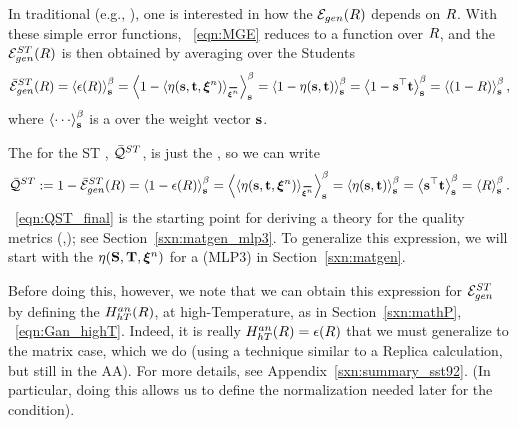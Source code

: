 In traditional \STATMECH (e.g., \cite{SST92}), one is interested in how the \emph{\TotalModelGeneralizationError} ${\mathcal{E}}_{gen}(R)$ depends on $R$.
With these simple error functions, \EQN~\ref{eqn:MGE} reduces to a function over $R$,
and the \AverageSTGeneralizationError ${\mathcal{E}}^{ST}_{gen}(R)$ is then obtained by averaging over the Students 
\begin{align}
\label{eqn:AVGSTGE_R}
\AVGSTGE(\AVGR)=\THRMAVG{\EPSL(\AVGR)}=
\THRMAVG{1-\langle\ETA(\SVEC,\TVEC,\NDXI)\rangle_{\AVGNDXI}}=
\THRMAVG{1-\ETA(\SVEC,\TVEC)}=
\THRMAVG{1-\SVEC^{\top}\TVEC}=
\THRMAVG{(1-\AVGR)}  ,
\end{align}
where $\THRMAVG{\cdots}$ is a \ThermalAverage over the \Student weight vector ${\mathbf{s}}$.

The \ModelQuality for the ST \Perceptron, $\bar{\mathcal{Q}}^{ST}$,
is just the \AverageGeneralizationAccuracy, so we can write
\begin{align}
\label{eqn:QST_final}
\Q^{ST} := 1 - \AVGSTGE(\AVGR) 
       = \THRMAVG{1 - \EPSL(\AVGR)} 
       = \THRMAVG{\langle\ETA(\SVEC, \TVEC, \NDXI)\rangle_{\AVGNDXI}} 
       = \THRMAVG{\ETA(\SVEC, \TVEC)} 
       = \THRMAVG{\SVEC^{\top}\TVEC} 
       = \THRMAVG{\AVGR}.
\end{align}
\EQN~\ref{eqn:QST_final} is the starting point for deriving a \SEMIEMP theory for the \WW quality metrics (\ALPHA,\ALPHAHAT);
see Section~\ref{sxn:matgen_mlp3}.
To generalize this expression, we will start with the \SelfOverlap $\eta({\mathbf{S}},{\mathbf{T}},\boldsymbol{\xi}^{n})$ for a
\MultiLayerPerceptron (MLP3) in Section~\ref{sxn:matgen}.

Before doing this, however, we note that we can obtain this expression for ${\mathcal{E}}^{ST}_{gen}$ by defining the
\AnnealedHamiltonian $H^{an}_{hT}(R)$, at high-Temperature, as in Section~\ref{sxn:mathP}, \EQN~\ref{eqn:Gan_highT}.
Indeed, it is really $H^{an}_{hT}(R)=\epsilon(R)$ that we must generalize to the matrix case, which we do (using a technique
similar to a Replica calculation, but still in the AA).
For more details, see Appendix~\ref{sxn:summary_sst92}.
(In particular, doing this allows us to define the normalization needed later for the \TRACELOG condition).


